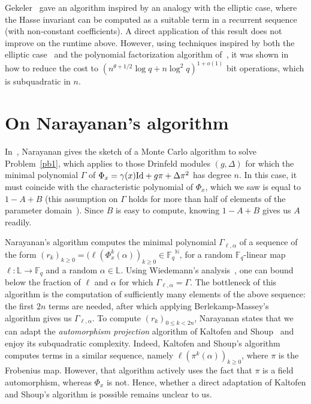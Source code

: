 \documentclass[sigconf]{acmart}
\newcommand{\F}{\mathbb{F}}
\newcommand{\N}{\mathbb{N}}
\renewcommand{\L}{\mathbb{L}}
\begin{document}
Gekeler~\cite[Prop.~3.7]{frobdist} gave an algorithm inspired by an
analogy with the elliptic case, where the Hasse invariant can be
computed as a suitable term in a recurrent sequence (with non-constant
coefficients). A direct application of this result does not improve on
the runtime above. However, using techniques inspired by both the
elliptic case~\cite{BoGaSc07} and the polynomial factorization
algorithm of~\cite{KaSh98}, it was shown
in~\cite{eschost2017arXiv171200669D} how to reduce the cost to
$(n^{\theta+1/2} \log q + n \log^2 q)^{1+o(1)}$ bit operations, which
is subquadratic in $n$.


\section{On Narayanan's algorithm}\label{sec:narayanan}

In~\cite[Sec.~3.1]{Narayanan18}, Narayanan gives the sketch of a Monte
Carlo algorithm to solve Problem~\ref{pb1}, which applies to those
Drinfeld modules $(g,\Delta)$ for which the minimal polynomial $\Gamma$ of
$\Phi_x=\gamma(x){\rm Id} + g \pi + \Delta \pi^2$ has degree $n$. In
this case, it must coincide with the characteristic polynomial of
$\Phi_x$, which we saw is equal to $1-A+B$ (this assumption on
$\Gamma$ holds for more than half of elements of the parameter
domain~\cite[Th.~3.6]{Narayanan18}). Since $B$ is easy to compute,
knowing $1-A+B$ gives us $A$ readily.

Narayanan's algorithm computes the minimal polynomial
$\Gamma_{\ell,\alpha}$ of a sequence of the form $(r_k)_{k \ge 0} =
(\ell(\Phi_x^k(\alpha))_{k\ge 0} \in {\F_q}^\N$, for a random $\F_q$-linear
map $\ell:\L\to\F_q$ and a random $\alpha \in \L$. Using Wiedemann's
analysis~\cite{Wiedemann:1986:SSL:13738.13744}, one can bound below
the fraction of $\ell$ and $\alpha$ for which
$\Gamma_{\ell,\alpha}=\Gamma$.
The bottleneck of this algorithm is the computation of sufficiently
many elements of the above sequence: the first $2n$ terms are needed,
after which applying Berlekamp-Massey's algorithm gives us
$\Gamma_{\ell,\alpha}$. To compute $(r_k)_{0 \le k < 2n}$, Narayanan states
that we can adapt the {\em automorphism projection} algorithm of
Kaltofen and Shoup~\cite{KaSh98} and enjoy its subquadratic
complexity. Indeed, Kaltofen and Shoup's algorithm computes terms in a similar
sequence, namely $\ell(\pi^k(\alpha))_{k\ge 0}$, where $\pi$ is 
the Frobenius map. However, that
algorithm actively uses the fact that $\pi$ is a field automorphism, whereas
$\Phi_x$ is not. Hence, whether a direct adaptation of Kaltofen
and Shoup's algorithm is possible remains unclear to us.
\end{document}
